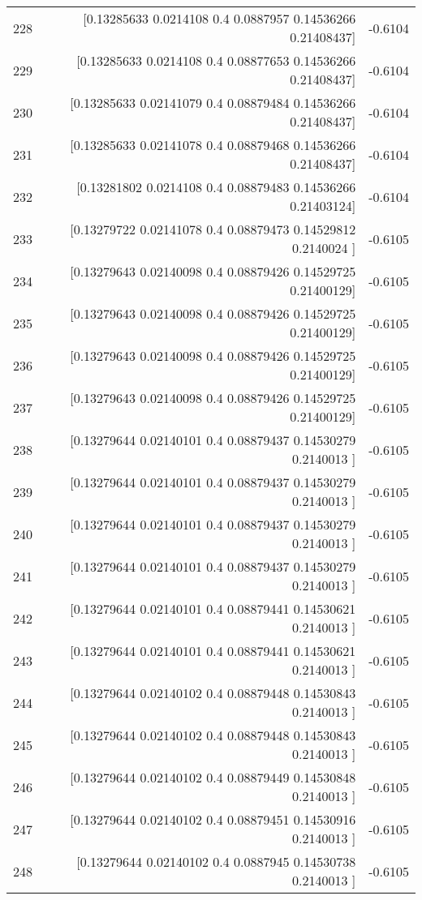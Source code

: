 \begin{longtable}{lrr}
228 & [0.13285633 0.0214108  0.4        0.0887957  0.14536266 0.21408437] & -0.6104 \\
229 & [0.13285633 0.0214108  0.4        0.08877653 0.14536266 0.21408437] & -0.6104 \\
230 & [0.13285633 0.02141079 0.4        0.08879484 0.14536266 0.21408437] & -0.6104 \\
231 & [0.13285633 0.02141078 0.4        0.08879468 0.14536266 0.21408437] & -0.6104 \\
232 & [0.13281802 0.0214108  0.4        0.08879483 0.14536266 0.21403124] & -0.6104 \\
233 & [0.13279722 0.02141078 0.4        0.08879473 0.14529812 0.2140024 ] & -0.6105 \\
234 & [0.13279643 0.02140098 0.4        0.08879426 0.14529725 0.21400129] & -0.6105 \\
235 & [0.13279643 0.02140098 0.4        0.08879426 0.14529725 0.21400129] & -0.6105 \\
236 & [0.13279643 0.02140098 0.4        0.08879426 0.14529725 0.21400129] & -0.6105 \\
237 & [0.13279643 0.02140098 0.4        0.08879426 0.14529725 0.21400129] & -0.6105 \\
238 & [0.13279644 0.02140101 0.4        0.08879437 0.14530279 0.2140013 ] & -0.6105 \\
239 & [0.13279644 0.02140101 0.4        0.08879437 0.14530279 0.2140013 ] & -0.6105 \\
240 & [0.13279644 0.02140101 0.4        0.08879437 0.14530279 0.2140013 ] & -0.6105 \\
241 & [0.13279644 0.02140101 0.4        0.08879437 0.14530279 0.2140013 ] & -0.6105 \\
242 & [0.13279644 0.02140101 0.4        0.08879441 0.14530621 0.2140013 ] & -0.6105 \\
243 & [0.13279644 0.02140101 0.4        0.08879441 0.14530621 0.2140013 ] & -0.6105 \\
244 & [0.13279644 0.02140102 0.4        0.08879448 0.14530843 0.2140013 ] & -0.6105 \\
245 & [0.13279644 0.02140102 0.4        0.08879448 0.14530843 0.2140013 ] & -0.6105 \\
246 & [0.13279644 0.02140102 0.4        0.08879449 0.14530848 0.2140013 ] & -0.6105 \\
247 & [0.13279644 0.02140102 0.4        0.08879451 0.14530916 0.2140013 ] & -0.6105 \\
248 & [0.13279644 0.02140102 0.4        0.0887945  0.14530738 0.2140013 ] & -0.6105 \\

\end{longtable}
